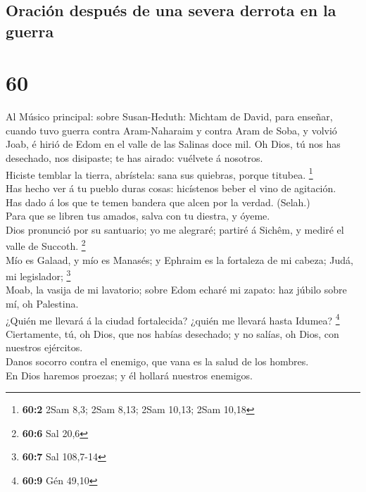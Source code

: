 \hypertarget{oraciuxf3n-despuuxe9s-de-una-severa-derrota-en-la-guerra}{%
\subsection{Oración después de una severa derrota en la
guerra}\label{oraciuxf3n-despuuxe9s-de-una-severa-derrota-en-la-guerra}}

\hypertarget{section-59}{%
\section{60}\label{section-59}}

 Al Músico principal: sobre Susan-Heduth: Michtam de David,
para enseñar, cuando tuvo guerra contra Aram-Naharaim y contra Aram de
Soba, y volvió Joab, é hirió de Edom en el valle de las Salinas doce
mil. Oh Dios, tú nos has desechado, nos disipaste; te has airado:
vuélvete á nosotros.\\
 Hiciste temblar la tierra, abrístela: sana sus quiebras,
porque titubea. \footnote{\textbf{60:2} 2Sam 8,3; 2Sam 8,13; 2Sam 10,13;
  2Sam 10,18}\\
 Has hecho ver á tu pueblo duras cosas: hicístenos beber el
vino de agitación.\\
 Has dado á los que te temen bandera que alcen por la
verdad. (Selah.)\\
 Para que se libren tus amados, salva con tu diestra, y
óyeme.\\
 Dios pronunció por su santuario; yo me alegraré; partiré á
Sichêm, y mediré el valle de Succoth. \footnote{\textbf{60:6} Sal 20,6}\\
 Mío es Galaad, y mío es Manasés; y Ephraim es la fortaleza
de mi cabeza; Judá, mi legislador; \footnote{\textbf{60:7} Sal 108,7-14}\\
 Moab, la vasija de mi lavatorio; sobre Edom echaré mi
zapato: haz júbilo sobre mí, oh Palestina.\\
 ¿Quién me llevará á la ciudad fortalecida? ¿quién me
llevará hasta Idumea? \footnote{\textbf{60:9} Gén 49,10}\\
 Ciertamente, tú, oh Dios, que nos habías desechado; y no
salías, oh Dios, con nuestros ejércitos.\\
 Danos socorro contra el enemigo, que vana es la salud de
los hombres.\\
 En Dios haremos proezas; y él hollará nuestros enemigos.

